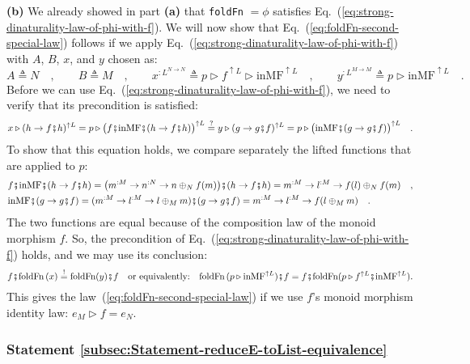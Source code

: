 \textbf{(b)} We already showed in part \textbf{(a)} that \lstinline!foldFn!
$=\phi$ satisfies Eq.~(\ref{eq:strong-dinaturality-law-of-phi-with-f}).
We will now show that Eq.~(\ref{eq:foldFn-second-special-law}) follows
if we apply Eq.~(\ref{eq:strong-dinaturality-law-of-phi-with-f})
with $A$, $B$, $x$, and $y$ chosen as:
\[
A\triangleq N\quad,\quad\quad B\triangleq M\quad,\quad\quad x^{:L^{N\rightarrow N}}\triangleq p\triangleright f^{\uparrow L}\triangleright\text{inMF}^{\uparrow L}\quad,\quad\quad y^{:L^{M\rightarrow M}}\triangleq p\triangleright\text{inMF}^{\uparrow L}\quad.
\]
Before we can use Eq.~(\ref{eq:strong-dinaturality-law-of-phi-with-f}),
we need to verify that its precondition is satisfied:
\[
x\triangleright(h\rightarrow f\bef h)^{\uparrow L}=p\triangleright\big(f\bef\text{inMF}\bef(h\rightarrow f\bef h)\big)^{\uparrow L}\overset{?}{=}y\triangleright(g\rightarrow g\bef f)^{\uparrow L}=p\triangleright\big(\text{inMF}\bef(g\rightarrow g\bef f)\big)^{\uparrow L}\quad.
\]
To show that this equation holds, we compare separately the lifted
functions that are applied to $p$:
\begin{align*}
 & f\bef\text{inMF}\bef(h\rightarrow f\bef h)=\big(m^{:M}\rightarrow n^{:N}\rightarrow n\oplus_{N}f(m)\big)\bef(h\rightarrow f\bef h)=m^{:M}\rightarrow l^{:M}\rightarrow f(l)\oplus_{N}f(m)\quad,\\
 & \text{inMF}\bef(g\rightarrow g\bef f)=(m^{:M}\rightarrow l^{:M}\rightarrow l\oplus_{M}m)\bef(g\rightarrow g\bef f)=m^{:M}\rightarrow l^{:M}\rightarrow f(l\oplus_{M}m)\quad.
\end{align*}
The two functions are equal because of the composition law of the
monoid morphism $f$. So, the precondition of Eq.~(\ref{eq:strong-dinaturality-law-of-phi-with-f})
holds, and we may use its conclusion:
\[
f\bef\text{foldFn}\,(x)\overset{!}{=}\text{foldFn}(y)\bef f\quad\text{or equivalently:}\quad\text{foldFn}\,(p\triangleright\text{inMF}^{\uparrow L})\bef f=f\bef\text{foldFn}(p\triangleright f^{\uparrow L}\bef\text{inMF}^{\uparrow L}).
\]
This gives the law~(\ref{eq:foldFn-second-special-law}) if we use
$f$\textsf{'}s monoid morphism identity law: $e_{M}\triangleright f=e_{N}$.

\subsubsection{Statement \label{subsec:Statement-reduceE-toList-equivalence}\ref{subsec:Statement-reduceE-toList-equivalence}}

